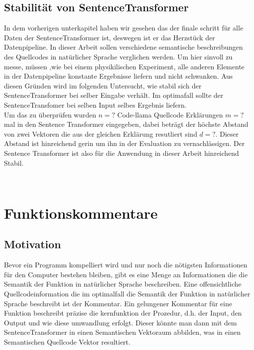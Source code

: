 \documentclass[12pt,letterpaper,ngerman]{article}
\begin{document}
\subsection{Stabilität von SentenceTransformer}
In dem vorherigen unterkapitel haben wir gesehen das der finale schritt 
für alle Daten der SentenceTransformer ist, deswegen ist er das Herzstück
der Datenpipeline. In dieser Arbeit sollen verschiedene semantische 
beschreibungen des Quellcodes in natürlicher Sprache verglichen werden.
Um hier sinvoll zu messe, müssen ,wie bei einem physikilischen Experiment,
alle anderen Elemente in der Datenpipeline konstante Ergebnisse liefern und 
nicht schwanken. Aus diesen Gründen wird im folgenden Untersucht, wie stabil
sich der SentenceTransformer bei selber Eingabe verhält. Im optimafall 
sollte der SentenceTransfomer bei selben Input selbes Ergebnis liefern. \\
Um das zu überprüfen wurden $n = ?$ Code-llama Quellcode Erklärungen 
$m = ?$ mal in den Sentence Transformer eingegeben, dabei beträgt der 
höchste Abstand von zwei Vektoren die aus der gleichen Erklärung resutliert
sind $d = ?$. Dieser Abstand ist hinreichend gerin um ihn in der Evaluation
zu vernachlässigen. Der Sentence Transformer ist also für die Anwendung in
dieser Arbeit hinreichend Stabil.






\
\section{Funktionskommentare}
\subsection{Motivation}
Bevor ein Programm kompelliert wird und nur noch die nötigsten Informationen
für den Computer bestehen bleiben, gibt es eine Menge an Informationen die 
die Semantik der Funktion in natürlicher Sprache beschreiben. Eine offensichtliche
Quellcodeinformation die im optimalfall die Semantik der Funktion in natürlicher
Sprache beschreibt ist der Kommentar. Ein gelungener Kommentar für eine Funktion
beschreibt präzise die kernfunktion der Prozedur, d.h. der Input, den Output
und wie diese umwandlung erfolgt. Dieser könnte man dann mit dem 
SentenceTransformer in einen Semantischen Vektoraum abbilden, was in einen
Semantischen Quellcode Vektor resultiert.
\end{document}
